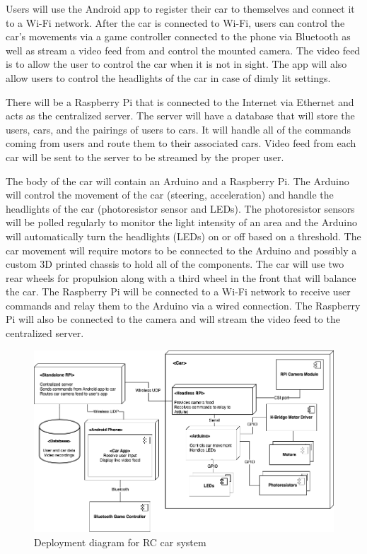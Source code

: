 \documentclass[letterpaper,12pt]{report}
\begin{document}
    Users will use the Android app to register their car to themselves and
    connect it to a Wi-Fi network. After the car is connected to Wi-Fi,
    users can control the car's movements via a game controller connected to
    the phone via Bluetooth as well as stream a video feed from and control
    the mounted camera. The video feed is to allow the user to control the
    car when it is not in sight. The app will also allow users to control
    the headlights of the car in case of dimly lit settings.

    There will be a Raspberry Pi that is connected to the Internet via
    Ethernet and acts as the centralized server. The server will have a
    database that will store the users, cars, and the pairings of users to
    cars. It will handle all of the commands coming from users and route
    them to their associated cars. Video feed from each car will be sent to
    the server to be streamed by the proper user.

    The body of the car will contain an Arduino and a Raspberry Pi. The
    Arduino will control the movement of the car (steering, acceleration) and
    handle the headlights of the car (photoresistor sensor and LEDs). The
    photoresistor sensors will be polled regularly to monitor the light
    intensity of an area and the Arduino will automatically turn the
    headlights (LEDs) on or off based on a threshold. The car movement will
    require motors to be connected to the Arduino and possibly a custom 3D
    printed chassis to hold all of the components. The car will use two rear
    wheels for propulsion along with a third wheel in the front that will
    balance the car. The Raspberry Pi will be connected to a Wi-Fi network to
    receive user commands and relay them to the Arduino via a wired
    connection. The Raspberry Pi will also be connected to the camera and
    will stream the video feed to the centralized server.

    \begin{figure}[H]
        \centering
        \includegraphics[width=0.9\linewidth]{diagrams/Design_Deployment_Diagram.png}
        \caption{Deployment diagram for RC car system}
        \label{fig:deployment}
    \end{figure}
\end{document}
